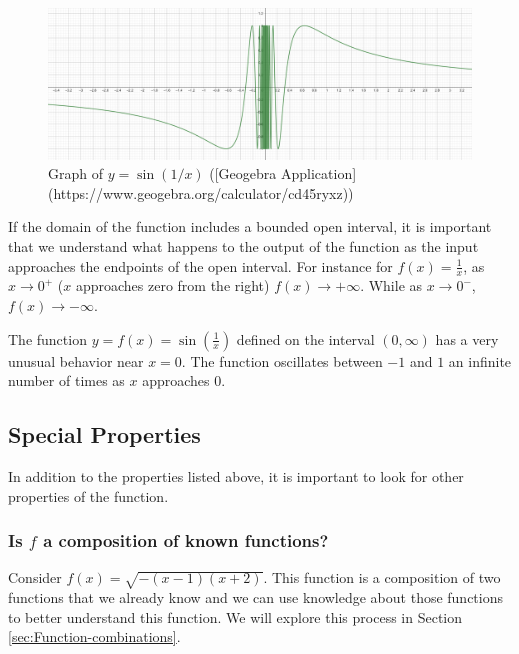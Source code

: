 \documentclass[
]{book}
\theoremstyle{definition}
\theoremstyle{definition}
\theoremstyle{definition}
\theoremstyle{definition}
\theoremstyle{remark}
\begin{document}
\begin{figure}

{\centering \includegraphics[width=0.9\linewidth]{tikz/sin-reciprical} 

}

\caption{Graph of $y=\sin(1/x)$ ([Geogebra Application](https://www.geogebra.org/calculator/cd45ryxz))}\label{fig:sin-recipricol}
\end{figure}

If the domain of the function includes a bounded open interval, it is important that we understand what happens to the output of the function as the input approaches the endpoints of the open interval. For instance for \(f(x)=\frac{1}{x}\), as \(x\rightarrow 0^+\) (\(x\) approaches zero from the right) \(f(x)\rightarrow +\infty\). While as \(x\rightarrow 0^-\), \(f(x)\rightarrow -\infty\).

The function \(y=f(x)=\sin\left(\frac{1}{x}\right)\) defined on the interval \((0,\infty)\) has a very unusual behavior near \(x=0\). The function oscillates between \(-1\) and \(1\) an infinite number of times as \(x\) approaches \(0\).

\hypertarget{special-properties}{%
\subsection{Special Properties}\label{special-properties}}

In addition to the properties listed above, it is important to look for other properties of the function.

\hypertarget{is-f-a-composition-of-known-functions}{%
\subsubsection*{\texorpdfstring{Is \(f\) a composition of known functions?}{Is f a composition of known functions?}}\label{is-f-a-composition-of-known-functions}}

Consider \(f(x)=\sqrt{-(x-1)(x+2)}\). This function is a composition of two functions that we already know and we can use knowledge about those functions to better understand this function. We will explore this process in Section \ref{sec:Function-combinations}.
\end{document}
